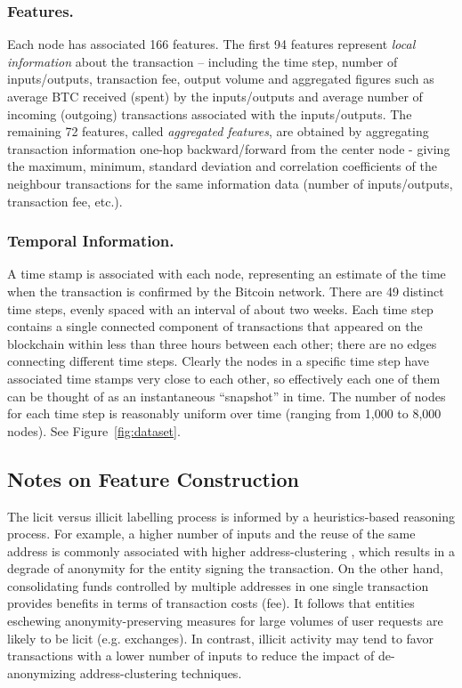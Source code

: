 \documentclass[sigconf,submission]{acmart}
\newcommand{\jc}[1]{{\color{red} #1}}
\begin{document}
\subsubsection{Features.} Each node has associated 166 features. The first 94 features represent \textit{local information} about the transaction -- including the time step, number of inputs/outputs, transaction fee, output volume and aggregated figures such as average BTC received (spent) by the inputs/outputs and average number of incoming (outgoing) transactions associated with the inputs/outputs. The remaining 72 features, called \textit{aggregated features}, are obtained by aggregating transaction information one-hop backward/forward from the center node - giving the maximum, minimum, standard deviation and correlation coefficients of the neighbour transactions for the same information data (number of inputs/outputs, transaction fee, etc.).

\subsubsection{Temporal Information.} A time stamp is associated with each node, representing an estimate of the time when the transaction is confirmed by the Bitcoin network. There are 49 distinct time steps, evenly spaced with an interval of about two weeks. Each time step contains a single connected component of transactions that appeared on the blockchain within less than three hours between each other; there are no edges connecting different time steps. Clearly the nodes in a specific time step have associated time stamps very close to each other, so effectively each one of them can be thought of as an instantaneous ``snapshot'' in time. The number of nodes for each time step is reasonably uniform over time (ranging from 1,000 to 8,000 nodes). See Figure~\ref{fig:dataset}.


\subsection{Notes on Feature Construction}

The licit versus illicit labelling process is informed by a heuristics-based reasoning process. For example, a higher number of inputs and the reuse of the same address is commonly associated with higher address-clustering \cite{harrigan2016unreasonable}, which results in a degrade of anonymity for the entity signing the transaction. On the other hand, consolidating funds controlled by multiple addresses in one single transaction provides benefits in terms of transaction costs (fee). It follows that entities eschewing anonymity-preserving measures for large volumes of user requests are likely to be licit (e.g. exchanges). In contrast, illicit activity may tend to favor transactions with a lower number of inputs to reduce the impact of de-anonymizing address-clustering techniques.
\end{document}
